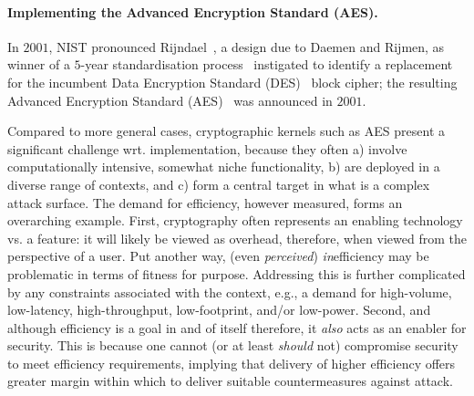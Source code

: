 
\paragraph{Implementing the Advanced Encryption Standard (AES).}

In $2001$, NIST pronounced Rijndael~\cite{DaeRij:98,DaeRij:02}, 
a design due to Daemen and Rijmen, 
as winner of a $5$-year standardisation process~\cite{NBBBDFR:01} instigated 
to identify a replacement for the incumbent
Data     Encryption Standard (DES)~\cite{FIPS:46} 
block cipher; the resulting 
Advanced Encryption Standard (AES)~\cite{FIPS:197} 
was announced in $2001$.

Compared to more general cases, cryptographic kernels such as AES present a
significant challenge wrt. implementation, because they often
a) involve computationally intensive, somewhat niche functionality,
b) are deployed in a diverse range of contexts,
   and
c) form a central target in what is a complex attack surface.
The demand for efficiency, however measured, forms an overarching example.  
First,
cryptography often represents an enabling technology vs. a feature: it will
likely be viewed as overhead, therefore, when viewed from the perspective 
of a user.  Put another way,  (even {\em perceived}) {\em in}efficiency may
be problematic in terms of fitness for purpose.  Addressing this is further 
complicated by any constraints associated with the context, e.g., a demand 
for
high-volume, 
 low-latency, 
high-throughput, 
 low-footprint, 
and/or 
 low-power.
Second,
and although efficiency is a goal in and of itself therefore, it {\em also} 
acts as an enabler for security.  This is because one cannot 
(or at least {\em should} not) 
compromise security to meet efficiency requirements, implying that delivery 
of higher efficiency offers greater margin within which to deliver suitable
countermeasures against attack.

